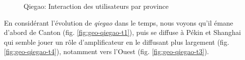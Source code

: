 \begin{figure}[htbp]
    \centering
    
  \caption{
    Qiegao: Interaction des utilisateurs par province
  }
\end{figure}

En considérant l{\textquoteright}évolution de \textit{qiegao} dans le temps, nous voyons qu{\textquoteright}il émane d{\textquoteright}abord de Canton (fig. \ref{fig:geo-qiegao-t1}), puis se diffuse \`a Pékin et Shanghai qui semble jouer un r\^ole d{\textquoteright}amplificateur en le diffusant plus largement (fig. \ref{fig:geo-qiegao-t4}), notamment vers l{\textquoteright}Ouest (fig. \ref{fig:geo-qiegao-t3}).  


